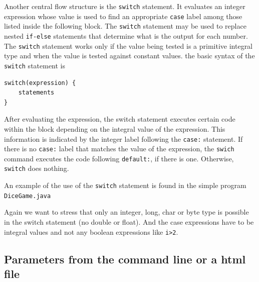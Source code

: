 Another central flow structure is the \verb|switch| statement. It
evaluates an integer expression whose value is used to find an
appropriate \verb|case| label among those listed inside the following
block. The \verb|switch| statement may be used to replace nested \verb|if-else|
statements that determine what is the output for each number. The
\verb|switch| statement works only if the value being tested is a
primitive integral type and when the value is tested against constant
values. the basic syntax of the \verb|switch| statement is
\begin{verbatim}
switch(expression) {
    statements
}
\end{verbatim}
After evaluating the expression, the switch statement executes
certain code within the block depending on the integral value of the
expression. This information is indicated by the integer label following
the \verb|case:| statement. If there is no \verb|case:| label that
matches the value of the expression, the \verb|swich| command executes
the code following \verb|default:|, if there is one. Otherwise,
\verb|switch| does nothing.

An example of the use of the \verb|switch| statement is found in the
simple program \verb|DiceGame.java| 


Again we want to stress that only an integer, long, char or byte type
is possible in the switch statement (no double or float). And the
case expressions have to be integral values and not any boolean
expressions like \verb|i>2|. 

\subsection{Parameters from the command line or a html file}
\label{sec:Parameter}

